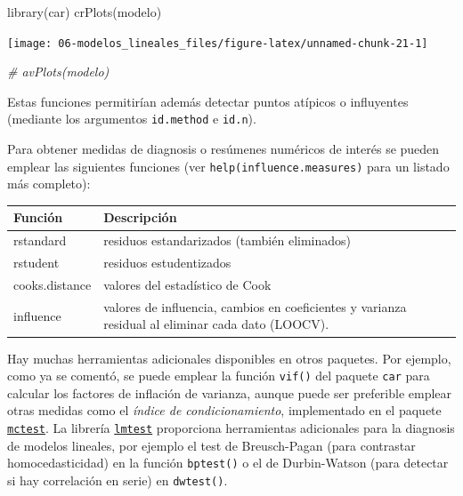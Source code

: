 \documentclass[
  spanish,
]{book}
\newenvironment{Shaded}{\begin{snugshade}}{\end{snugshade}}
\newcommand{\CommentTok}[1]{\textcolor[rgb]{0.56,0.35,0.01}{\textit{#1}}}
\newcommand{\FunctionTok}[1]{\textcolor[rgb]{0.00,0.00,0.00}{#1}}
\newcommand{\NormalTok}[1]{#1}
\theoremstyle{break}
\theoremstyle{definition}
\theoremstyle{definition}
\theoremstyle{definition}
\theoremstyle{definition}
\theoremstyle{remark}
\begin{document}
\begin{Shaded}
\begin{Highlighting}[]
\FunctionTok{library}\NormalTok{(car)}
\FunctionTok{crPlots}\NormalTok{(modelo)}
\end{Highlighting}
\end{Shaded}

\begin{center}\texttt{[image: 06-modelos\_lineales\_files/figure-latex/unnamed-chunk-21-1]} \end{center}

\begin{Shaded}
\begin{Highlighting}[]
\CommentTok{\# avPlots(modelo)}
\end{Highlighting}
\end{Shaded}

Estas funciones permitirían además detectar puntos atípicos o influyentes
(mediante los argumentos \texttt{id.method} e \texttt{id.n}).

Para obtener medidas de diagnosis o resúmenes numéricos de interés se pueden emplear
las siguientes funciones (ver \texttt{help(influence.measures)} para un listado más completo):

\begin{longtable}[]{@{}
  >{\raggedright\arraybackslash}p{}
  >{\raggedright\arraybackslash}p{}@{}}
\toprule
Función & Descripción \\
\midrule
\endhead
rstandard & residuos estandarizados (también eliminados) \\
rstudent & residuos estudentizados \\
cooks.distance & valores del estadístico de Cook \\
influence & valores de influencia, cambios en coeficientes y varianza residual al eliminar cada dato (LOOCV). \\
\bottomrule
\end{longtable}

Hay muchas herramientas adicionales disponibles en otros paquetes.
Por ejemplo, como ya se comentó, se puede emplear la función
\texttt{vif()} del paquete \texttt{car} para calcular los factores de inflación de varianza,
aunque puede ser preferible emplear otras medidas como el \emph{índice de condicionamiento},
implementado en el paquete \href{https://CRAN.R-project.org/package=mctest}{\texttt{mctest}}.
La librería \href{https://CRAN.R-project.org/package=lmtest}{\texttt{lmtest}} proporciona herramientas adicionales para la diagnosis de modelos lineales,
por ejemplo el test de Breusch-Pagan (para contrastar homocedasticidad) en la función \texttt{bptest()}
o el de Durbin-Watson (para detectar si hay correlación en serie) en \texttt{dwtest()}.
\end{document}
